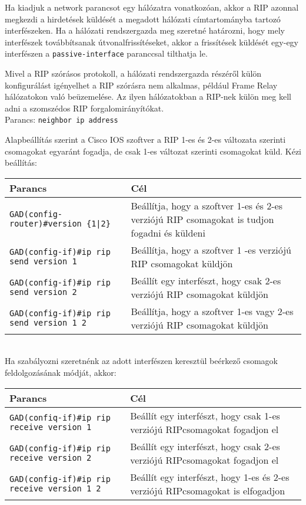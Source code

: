Ha kiadjuk a network parancsot egy hálózatra vonatkozóan, akkor a RIP azonnal megkezdi a hirdetések küldését a megadott hálózati címtartományba tartozó interfészeken. Ha a hálózati rendszergazda meg szeretné határozni, hogy mely interfészek továbbítsanak útvonalfrissítéseket, akkor a frissítések küldését egy-egy interfészen a \verb|passive-interface| paranccsal tilthatja le.

Mivel a RIP szórásos protokoll, a hálózati rendszergazda részéről külön konfigurálást igényelhet a RIP szórásra nem alkalmas, például Frame Relay hálózatokon való beüzemelése. Az ilyen hálózatokban a RIP-nek külön meg kell adni a szomszédos RIP forgalomirányítókat.\\
Parancs: \verb|neighbor ip address|

Alapbeállítás szerint a Cisco IOS szoftver a RIP 1-es és 2-es változata szerinti csomagokat egyaránt fogadja, de csak 1-es változat szerinti csomagokat küld. Kézi beállítás:\\
\begin{tabularx}{\textwidth}{l X}
	Parancs & Cél \\ 
	\hline
	\verb+GAD(config-router)#version {1|2}+ & Beállítja, hogy a szoftver 1-es és 2-es verziójú RIP csomagokat is tudjon fogadni és küldeni \\ 
	\verb+GAD(config-if)#ip rip send version 1+ & Beállítja, hogy a szoftver 1 -es verziójú RIP csomagokat küldjön\\
	\verb+GAD(config-if)#ip rip send version 2+ & Beállít egy interfészt, hogy csak 2-es verziójú RIP csomagokat küldjön\\
	\verb+GAD(config-if)#ip rip send version 1 2+ & Beállítja, hogy a szoftver 1-es vagy 2-es verziójú RIP csomagokat küldjön\\
\end{tabularx}
\\
Ha szabályozni szeretnénk az adott interfészen keresztül beérkező csomagok feldolgozásának módját, akkor:\\
\begin{tabularx}{\textwidth}{l X}
	Parancs & Cél \\ 
	\hline
	\verb|GAD(confiq-if)#ip rip receive version 1| & Beállít egy interfészt, hogy csak 1-es verziójú RIPcsomagokat fogadjon el\\
	\verb|GAD(config-if)#ip rip receive version 2| & Beállít egy interfészt, hogy csak 2-es verziójú RIPcsomagokat fogadjon el\\
	\verb|GAD(config-if)#ip rip receive version 1 2| & Beállít egy interfészt, hogy 1-es és 2-es verziójú RIPcsomagokat is elfogadjon
\end{tabularx}